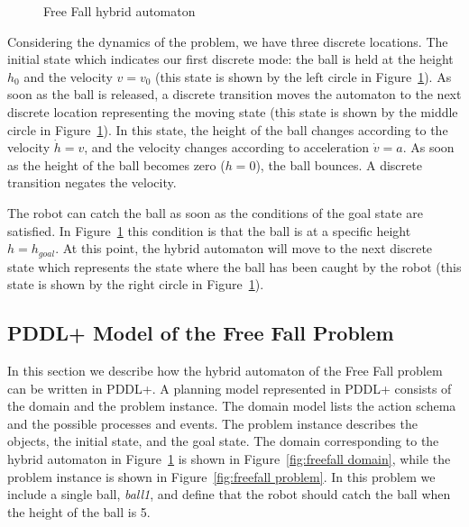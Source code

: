 \begin{figure}[ht]
\centering

\caption{Free Fall hybrid automaton}
\label{fig:Free Fall hybrid automaton}
\end{figure}

Considering the dynamics of the problem, we have three discrete locations. The initial state which indicates our first discrete mode: the ball is held at the height $h_0$ and the velocity $v = v_0$ (this state is shown by the left circle in Figure~\ref{fig:Free Fall hybrid automaton}). As soon as the ball is released, a discrete transition moves the automaton to the next discrete location representing the moving state (this state is shown by the middle circle in Figure~\ref{fig:Free Fall hybrid automaton}). In this state, the height of the ball changes according to the velocity $\dot{h}=v$, and the velocity changes according to acceleration $\dot{v}=a$. As soon as the height of the ball becomes zero ($h=0$), the ball bounces. A discrete transition negates the velocity.

The robot can catch the ball as soon as the conditions of the goal state are satisfied. In Figure~\ref{fig:Free Fall hybrid automaton} this condition is that the ball is at a specific height $h=h_{goal}$. At this point, the hybrid automaton will move to the next discrete state which represents the state where the ball has been caught by the robot (this state is shown by the right circle in Figure~\ref{fig:Free Fall hybrid automaton}).

\subsection{PDDL+ Model of the Free Fall Problem}

In this section we describe how the hybrid automaton of the Free Fall problem can be written in PDDL+. A planning model represented in PDDL+ consists of the domain and the problem instance. The domain model lists the action schema and the possible processes and events. The problem instance describes the objects, the initial state, and the goal state. The domain corresponding to the hybrid automaton in Figure~\ref{fig:Free Fall hybrid automaton} is shown in Figure~\ref{fig:freefall domain}, while the problem instance is shown in Figure~\ref{fig:freefall problem}. In this problem we include a single ball, \textit{ball1}, and define that the robot should catch the ball when the height of the ball is 5.

